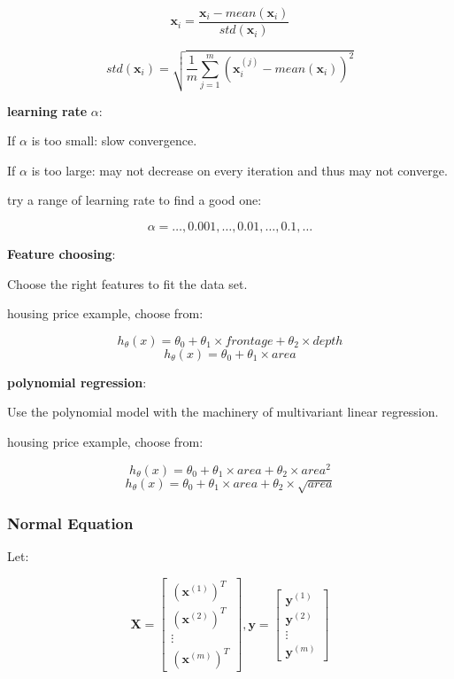 \documentclass{article}
\begin{document}
\[\textbf{x}_i = \frac{\textbf{x}_i - mean(\textbf{x}_i)}{std(\textbf{x}_i)}\]

\[std(\textbf{x}_i) = \sqrt{ \frac{1}{m} \sum_{j = 1}^m (\textbf{x}^{(j)}_i - mean(\textbf{x}_i))^2}\]

\noindent \textbf{learning rate} \(\alpha\):

\noindent If \(\alpha\) is too small: slow convergence.

\noindent If \(\alpha\) is too large: may not decrease on every iteration and thus may not converge.

\noindent try a range of learning rate to find a good one:

\[\alpha = \dots, 0.001, \dots, 0.01, \dots, 0.1, \dots\]

\noindent \textbf{Feature choosing}:

\noindent Choose the right features to fit the data set.

\noindent housing price example, choose from:

\[h_{\theta}(x) = \theta_0 + \theta_1 \times frontage + \theta_2 \times depth\]
\[h_{\theta}(x) = \theta_0 + \theta_1 \times area\]

\noindent \textbf{polynomial regression}:

\noindent Use the polynomial model with the machinery of multivariant linear regression.

\noindent housing price example, choose from:

\[h_{\theta}(x) = \theta_0 + \theta_1 \times area + \theta_2 \times area^2\]
\[h_{\theta}(x) = \theta_0 + \theta_1 \times area + \theta_2 \times \sqrt{area}\]

\subsubsection{Normal Equation}

\noindent Let:

\[
\textbf{X} = 
\begin{bmatrix}
(\textbf{x}^{(1)})^T\\
(\textbf{x}^{(2)})^T\\
\vdots\\
(\textbf{x}^{(m)})^T
\end{bmatrix}
,
\textbf{y} = 
\begin{bmatrix}
\textbf{y}^{(1)}\\
\textbf{y}^{(2)}\\
\vdots\\
\textbf{y}^{(m)}
\end{bmatrix}
\]
\end{document}
